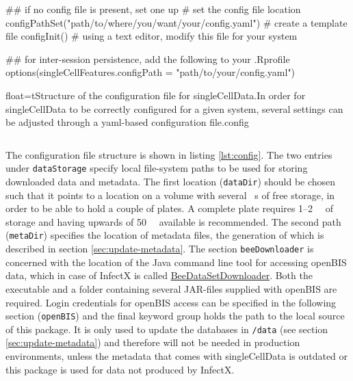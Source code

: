\begin{rflow}
## if no config file is present, set one up
# set the config file location
configPathSet("path/to/where/you/want/your/config.yaml")
# create a template file
configInit()
# using a text editor, modify this file for your system

## for inter-session persistence, add the following to your .Rprofile
options(singleCellFeatures.configPath = "path/to/your/config.yaml")
\end{rflow}


\begin{rlisting}{float=t}{Structure of the configuration file for singleCellData.}{In order for singleCellData to be correctly configured for a given system, several settings can be adjusted through a yaml-based configuration file.}{config}
  \inputminted[fontsize=\footnotesize,linenos,numbersep=4pt,style=knitr]{yaml}{data/config.yaml}
\end{rlisting}

The configuration file structure is shown in listing \ref{lst:config}. The two entries under \texttt{dataStorage} specify local file-system paths to be used for storing downloaded data and metadata. The first location (\texttt{dataDir}) should be chosen such that it points to a location on a volume with several \si{\giga\byte}s of free storage, in order to be able to hold a couple of plates. A complete plate requires 1--\SI{2}{\giga\byte} of storage and having upwards of \SI{50}{\giga\byte} available is recommended. The second path (\texttt{metaDir}) specifies the location of metadata files, the generation of which is described in section \ref{sec:update-metadata}. The section \texttt{beeDownloader} is concerned with the location of the Java command line tool for accessing openBIS data, which in case of InfectX is called \href{https://wiki.systemsx.ch/pages/viewpage.action?title=InfectX+Single+Cell+Data+Access&spaceKey=InfectXRTD}{BeeDataSetDownloader}. Both the executable and a folder containing several JAR-files supplied with openBIS are required. Login credentials for openBIS access can be specified in the following section (\texttt{openBIS}) and the final keyword group holds the path to the local source of this package. It is only used to update the databases in \texttt{/data} (see section \ref{sec:update-metadata}) and therefore will not be needed in production environments, unless the metadata that comes with singleCellData is outdated or this package is used for data not produced by InfectX.

